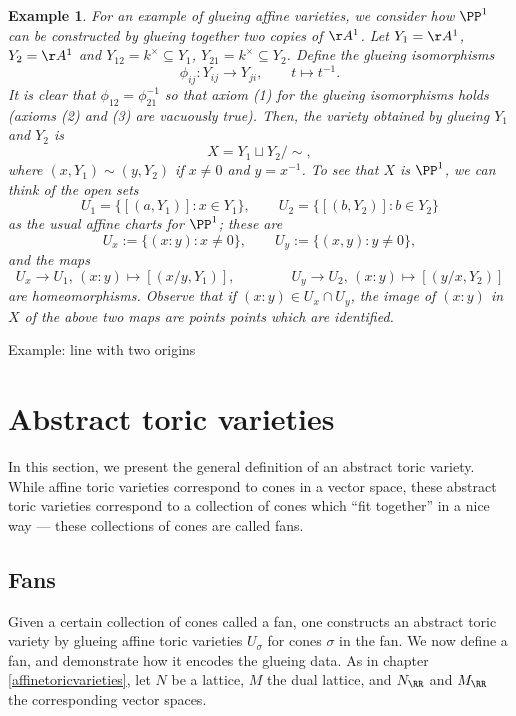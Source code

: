 \documentclass[12pt]{amsart}
\theoremstyle{plain}
\newtheorem{example}[theorem]{Example}
\begin{document}
\begin{example}
For an example of glueing affine varieties, we consider how $\PP^1$ can be constructed by glueing together two copies of $\AA^1$.
Let $Y_1=\AA^1$, $Y_2 = \AA^1$ and $Y_{12} = k^\times \subseteq Y_1$, $Y_{21} = k^\times \subseteq Y_2$.
Define the glueing isomorphisms
$$\phi_{ij} : Y_{ij} \to Y_{ji}, \qquad t \mapsto t^{-1}.$$
It is clear that $\phi_{12} = \phi_{21}^{-1}$ so that axiom (1) for the glueing isomorphisms holds (axioms (2) and (3) are vacuously true).
Then, the variety obtained by glueing $Y_1$ and $Y_2$ is
$$X = Y_1 \sqcup Y_2 / \sim,$$
where $(x, Y_1) \sim (y, Y_2)$ if $x \ne 0$ and $y = x^{-1}$.
To see that $X$ is $\PP^1$, we can  think of the open sets
$$U_1 = \{[(a, Y_1)] : x \in Y_1\}, \qquad U_2 = \{[(b, Y_2)] : b \in Y_2\}$$
as the usual affine charts for $\PP^1$;
these are
$$U_x := \{(x:y) : x \ne 0\}, \qquad U_y := \{(x, y) : y \ne 0\},$$
and the maps
$$U_x \to U_1, \, (x : y)\mapsto [(x/y, Y_1)], \qquad \qquad U_y \to U_2, \, (x : y)\mapsto [(y/x, Y_2)]$$
are homeomorphisms.
Observe that if $(x : y) \in U_x \cap U_y$, the image of $(x : y)$ in $X$ of the above two maps are points points which are identified.
\end{example}

Example: line with two origins


\newpage
\section{Abstract toric varieties}
In this section, we present the general definition of an abstract toric variety.
While affine toric varieties correspond to cones in a vector space, these abstract toric varieties correspond to a collection of cones which ``fit together'' in a nice way --- these collections of cones are called fans.


\subsection{Fans}
Given a certain collection of cones called a fan, one constructs an abstract toric variety by glueing affine toric varieties $U_\sigma$ for cones $\sigma$ in the fan.
We now define a fan, and demonstrate how it encodes the glueing data.
As in chapter \ref{affinetoricvarieties}, let $N$ be a lattice, $M$ the dual lattice, and $N_\RR$ and $M_\RR$ the corresponding vector spaces.
\end{document}
